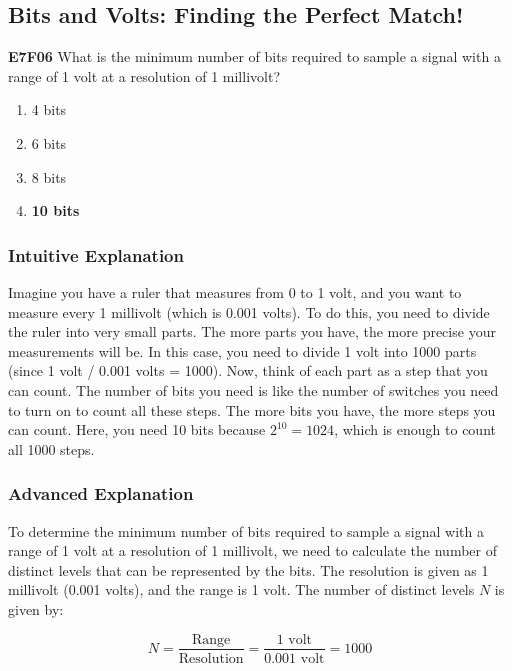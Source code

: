 \subsection{Bits and Volts: Finding the Perfect Match!}
\label{sec:E7F06}

\begin{tcolorbox}[colback=blue!5!white,colframe=blue!75!black,title=E7F06]
\textbf{E7F06} What is the minimum number of bits required to sample a signal with a range of 1 volt at a resolution of 1 millivolt?
\begin{enumerate}[label=\Alph*),noitemsep]
    \item 4 bits
    \item 6 bits
    \item 8 bits
    \item \textbf{10 bits}
\end{enumerate}
\end{tcolorbox}

\subsubsection{Intuitive Explanation}
Imagine you have a ruler that measures from 0 to 1 volt, and you want to measure every 1 millivolt (which is 0.001 volts). To do this, you need to divide the ruler into very small parts. The more parts you have, the more precise your measurements will be. In this case, you need to divide 1 volt into 1000 parts (since 1 volt / 0.001 volts = 1000). Now, think of each part as a step that you can count. The number of bits you need is like the number of switches you need to turn on to count all these steps. The more bits you have, the more steps you can count. Here, you need 10 bits because \(2^{10} = 1024\), which is enough to count all 1000 steps.

\subsubsection{Advanced Explanation}
To determine the minimum number of bits required to sample a signal with a range of 1 volt at a resolution of 1 millivolt, we need to calculate the number of distinct levels that can be represented by the bits. The resolution is given as 1 millivolt (0.001 volts), and the range is 1 volt. The number of distinct levels \(N\) is given by:

\[
N = \frac{\text{Range}}{\text{Resolution}} = \frac{1 \text{ volt}}{0.001 \text{ volt}} = 1000
\]

